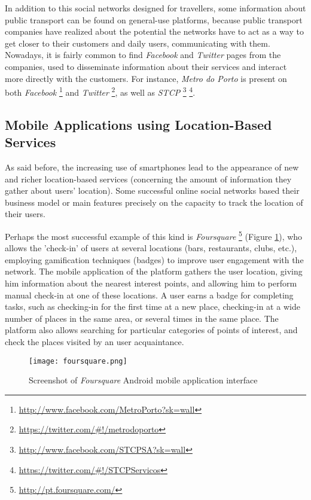 In addition to this social networks designed for travellers, some information about public transport can be found on general-use platforms, because public transport companies have realized about the potential the networks have to act as a way to get closer to their customers and daily users, communicating with them.
Nowadays, it is fairly common to find \emph{Facebook} and \emph{Twitter} pages from the companies, used to disseminate information about their services and interact more directly with the customers.
For instance, \emph{Metro do Porto} is present on both \emph{Facebook} \footnote{\url{http://www.facebook.com/MetroPorto?sk=wall}} and \emph{Twitter} \footnote{\url{https://twitter.com/\#!/metrodoporto}}, as well as \emph{STCP} \footnote{\url{http://www.facebook.com/STCPSA?sk=wall}} \footnote{\url{https://twitter.com/\#!/STCPServicos}}.

\subsection{Mobile Applications using Location-Based Services}

As said before, the increasing use of smartphones lead to the appearance of new and richer location-based services (concerning the amount of information they gather about users' location). Some successful online social networks based their business model or main features precisely on the capacity to track the location of their users.

Perhaps the most successful example of this kind is \emph{Foursquare} \footnote{\url{http://pt.foursquare.com/}} (Figure \ref{fig:fsqr}), who allows the 'check-in' of users at several locations (bars, restaurants, clubs, etc.), employing gamification techniques (badges) to improve user engagement with the network. The mobile application of the platform gathers the user location, giving him information about the nearest interest points, and allowing him to perform manual check-in at one of these locations.
A user earns a badge for completing tasks, such as checking-in for the first time at a new place, checking-in at a wide number of places in the same area, or several times in the same place. The platform also allows searching for particular categories of points of interest, and check the places visited by an user acquaintance.

\begin{figure}[h!]
  \begin{center}
    \leavevmode
    \texttt{[image: foursquare.png]}
    \caption{Screenshot of \emph{Foursquare} Android mobile application interface}
    \label{fig:fsqr}
  \end{center}
\end{figure}


